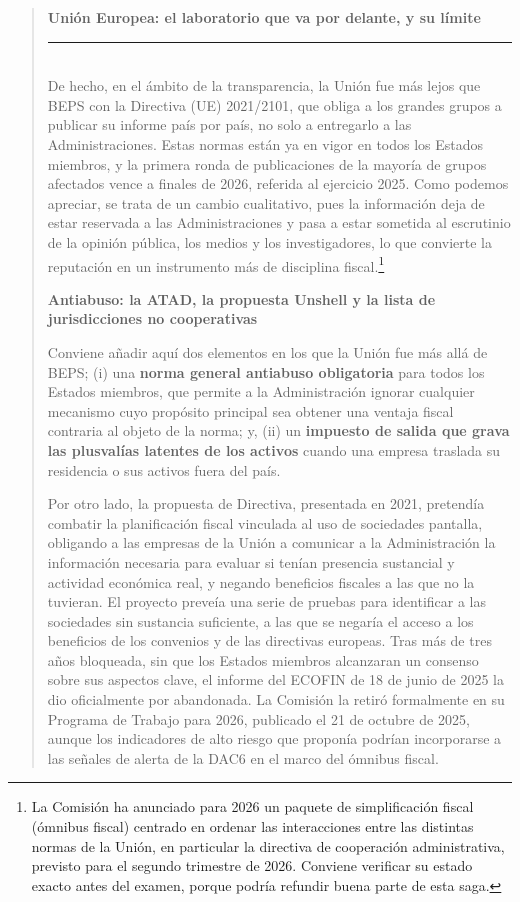 \documentclass[10pt,a4paper]{article}
\newenvironment{specialblock}[1]{%
      \begin{quote} %
      \small %
      \noindent\textbf{#1}\\[-0.3em] %
      \rule{\linewidth}{0.4pt}\\[0.6em]}{
      \end{quote}}
\begin{document}
\begin{specialblock}{\textbf{Unión Europea}: el laboratorio que va por delante, y su límite}
    De hecho, en el ámbito de la transparencia, la Unión fue más lejos que BEPS con la Directiva (UE) 2021/2101, que obliga a los grandes grupos a publicar su informe país por país, no solo a entregarlo a las Administraciones. Estas normas están ya en vigor en todos los Estados miembros, y la primera ronda de publicaciones de la mayoría de grupos afectados vence a finales de 2026, referida al ejercicio 2025. Como podemos apreciar, se trata de un cambio cualitativo, pues la información deja de estar reservada a las Administraciones y pasa a estar sometida al escrutinio de la opinión pública, los medios y los investigadores, lo que convierte la reputación en un instrumento más de disciplina fiscal.\footnote{%
        La Comisión ha anunciado para 2026 un paquete de simplificación fiscal (ómnibus fiscal) centrado en ordenar las interacciones entre las distintas normas de la Unión, en particular la directiva de cooperación administrativa, previsto para el segundo trimestre de 2026. Conviene verificar su estado exacto antes del examen, porque podría refundir buena parte de esta saga.
    }

    \textbf{Antiabuso: la ATAD, la propuesta Unshell y la lista de jurisdicciones no cooperativas}
    
    Conviene añadir aquí dos elementos en los que la Unión fue más allá de BEPS; (i) una \textbf{norma general antiabuso obligatoria} para todos los Estados miembros, que permite a la Administración ignorar cualquier mecanismo cuyo propósito principal sea obtener una ventaja fiscal contraria al objeto de la norma; y, (ii) un \textbf{impuesto de salida que grava las plusvalías latentes de los activos} cuando una empresa traslada su residencia o sus activos fuera del país. 
    
    Por otro lado, la propuesta de Directiva, presentada en 2021, pretendía combatir la planificación fiscal vinculada al uso de sociedades pantalla, obligando a las empresas de la Unión a comunicar a la Administración la información necesaria para evaluar si tenían presencia sustancial y actividad económica real, y negando beneficios fiscales a las que no la tuvieran. El proyecto preveía una serie de pruebas para identificar a las sociedades sin sustancia suficiente, a las que se negaría el acceso a los beneficios de los convenios y de las directivas europeas. Tras más de tres años bloqueada, sin que los Estados miembros alcanzaran un consenso sobre sus aspectos clave, el informe del ECOFIN de 18 de junio de 2025 la dio oficialmente por abandonada. La Comisión la retiró formalmente en su Programa de Trabajo para 2026, publicado el 21 de octubre de 2025, aunque los indicadores de alto riesgo que proponía podrían incorporarse a las señales de alerta de la DAC6 en el marco del ómnibus fiscal. 
    

\end{specialblock}
\end{document}

